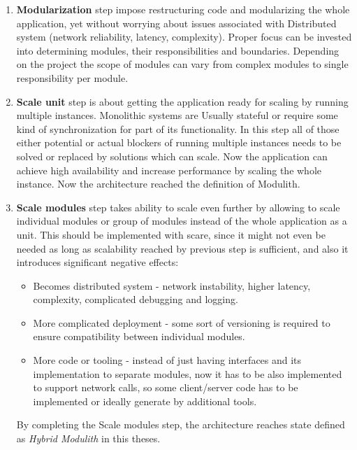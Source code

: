 \begin{enumerate}
    \item \textbf{Modularization} step impose restructuring code and modularizing the whole application, yet without worrying about issues associated with Distributed system (network reliability, latency, complexity). Proper focus can be invested into determining modules, their responsibilities and boundaries. Depending on the project the scope of modules can vary from complex modules to single responsibility per module.
    \item \textbf{Scale unit} step is about getting the application ready for scaling by running multiple instances. Monolithic systems are Usually stateful or require some kind of synchronization for part of its functionality. In this step all of those either potential or actual blockers of running multiple instances needs to be solved or replaced by solutions which can scale. Now the application can achieve high availability and increase performance by scaling the whole instance. Now the architecture reached the definition of Modulith.
    \item \textbf{Scale modules} step takes ability to scale even further by allowing to scale individual modules or group of modules instead of the whole application as a unit. This should be implemented with scare, since it might not even be needed as long as scalability reached by previous step is sufficient, and also it introduces significant negative effects:
          \begin{itemize}
              \item Becomes distributed system - network instability, higher latency, complexity, complicated debugging and logging.
              \item More complicated deployment - some sort of versioning is required to ensure compatibility between individual modules.
              \item More code or tooling - instead of just having interfaces and its implementation to separate modules, now it has to be also implemented to support network calls, so some client/server code has to be implemented or ideally generate by additional tools.
          \end{itemize}
          By completing the Scale modules step, the architecture reaches state defined as \textit{Hybrid Modulith} in this theses.
\end{enumerate}

